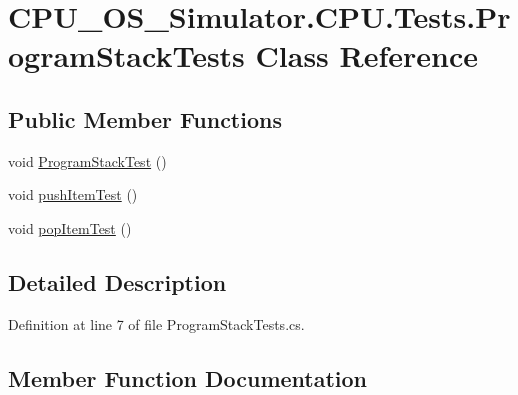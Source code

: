 \hypertarget{class_c_p_u___o_s___simulator_1_1_c_p_u_1_1_tests_1_1_program_stack_tests}{}\section{C\+P\+U\+\_\+\+O\+S\+\_\+\+Simulator.\+C\+P\+U.\+Tests.\+Program\+Stack\+Tests Class Reference}
\label{class_c_p_u___o_s___simulator_1_1_c_p_u_1_1_tests_1_1_program_stack_tests}
\subsection*{Public Member Functions}
\begin{DoxyCompactItemize}
\item 
void \hyperlink{class_c_p_u___o_s___simulator_1_1_c_p_u_1_1_tests_1_1_program_stack_tests_ae3a306f6e91d99a537f07fc4a4177c84}{Program\+Stack\+Test} ()
\item 
void \hyperlink{class_c_p_u___o_s___simulator_1_1_c_p_u_1_1_tests_1_1_program_stack_tests_aa0f5fc338f3b32423b71181218721c40}{push\+Item\+Test} ()
\item 
void \hyperlink{class_c_p_u___o_s___simulator_1_1_c_p_u_1_1_tests_1_1_program_stack_tests_ab98851c55e2cb5ce81feaae1e717b3d4}{pop\+Item\+Test} ()
\end{DoxyCompactItemize}


\subsection{Detailed Description}


Definition at line 7 of file Program\+Stack\+Tests.\+cs.



\subsection{Member Function Documentation}
\hypertarget{class_c_p_u___o_s___simulator_1_1_c_p_u_1_1_tests_1_1_program_stack_tests_ab98851c55e2cb5ce81feaae1e717b3d4}{}
